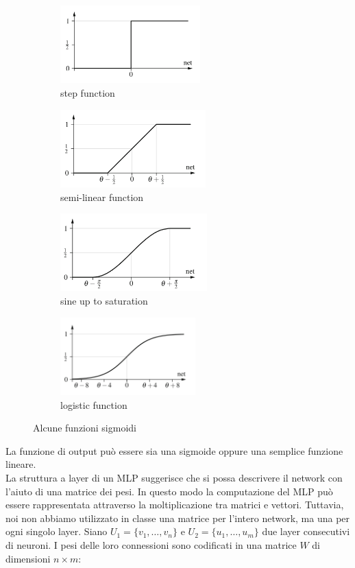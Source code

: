 \documentclass[10pt,a4paper]{article}
\begin{document}
\begin{figure}

\begin{subfigure}{0.5\textwidth}
\includegraphics[width=0.9\linewidth, height=3cm]{img/step.png} 
\caption{step function}
\end{subfigure} %
\begin{subfigure}{0.5\textwidth}
\includegraphics[width=0.9\linewidth, height=3cm]{img/semilinear.png}
\caption{semi-linear function}
\end{subfigure} 
\begin{subfigure}{0.5\textwidth}
\includegraphics[width=0.9\linewidth, height=3cm]{img/sineup.png} 
\caption{sine up to saturation}
\end{subfigure}
\begin{subfigure}{0.5\textwidth}
\includegraphics[width=0.9\linewidth, height=3cm]{img/logistic.png} 
\caption{logistic function}
\end{subfigure}


\caption{Alcune funzioni sigmoidi}
\label{fig:10}
\end{figure}

La funzione di output può essere sia una sigmoide oppure una semplice funzione lineare. \\
La struttura a layer di un MLP suggerisce che si possa descrivere il network con l'aiuto di una matrice dei pesi. In questo modo la computazione del MLP può essere rappresentata attraverso la moltiplicazione tra matrici e vettori. Tuttavia, noi non abbiamo utilizzato in classe una matrice per l'intero network, ma una per ogni singolo layer. Siano $U_1 = \{ v_1, \dots, v_n \}$ e $U_2 = \{ u_1, \dots, u_m \}$ due layer consecutivi di neuroni. I pesi delle loro connessioni sono codificati in una matrice $W$ di dimensioni $n \times m$:
\end{document}
